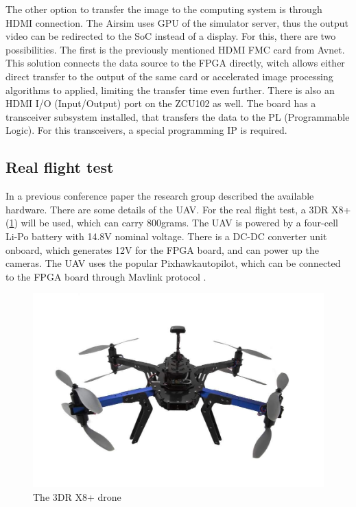 The other option to transfer the image to the computing system is through HDMI connection.
The Airsim uses GPU of the simulator server, thus the output video can be redirected to the SoC instead of a display.
For this, there are two possibilities.
The first is the previously mentioned HDMI FMC card from Avnet\texttrademark.
This solution connects the data source to the FPGA directly, witch allows either direct transfer to the output of the same card or accelerated image processing algorithms to applied, limiting the transfer time even further.
There is also an HDMI I/O (Input/Output) port on the ZCU102 as well.
The board has a transceiver subsystem installed, that transfers the data to the PL (Programmable Logic).
For this transceivers, a special programming IP is required.

\subsection{Real flight test} %
In a previous conference paper \cite{8798265} the research group described the available hardware.
There are some details of the UAV.
For the real flight test, a 3DR X8+ \cite{x8} (\cref{fig:drone}) will be used, which can carry 800grams.
The UAV is powered by a four-cell Li-Po battery with 14.8V nominal voltage.
There is a DC-DC converter unit onboard, which generates 12V for the FPGA board, and can power up the cameras.
The UAV uses the popular Pixhawk\texttrademark autopilot, which can be connected to the FPGA board through Mavlink protocol \cite{Fuller2014HardwareDA}.
\begin{figure}
    \centering
    \includegraphics[width=\linewidth]{images/3DR-X8.jpg}
    \caption{The 3DR X8+ drone}
    \label{fig:drone}
\end{figure}

